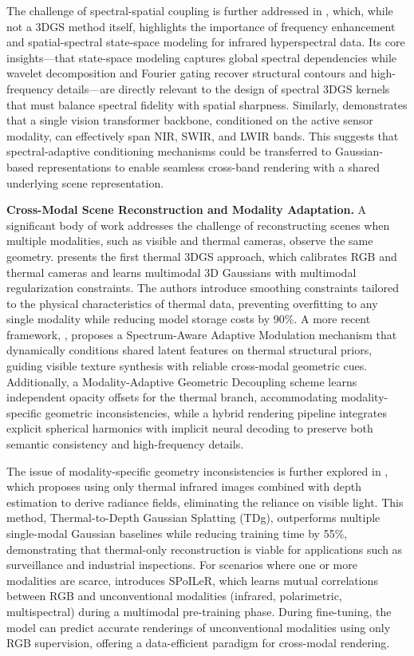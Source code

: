 \documentclass[11pt]{article}
\begin{document}
The challenge of spectral-spatial coupling is further addressed in \cite{ref620}, which, while not a 3DGS method itself, highlights the importance of frequency enhancement and spatial-spectral state-space modeling for infrared hyperspectral data. Its core insights---that state-space modeling captures global spectral dependencies while wavelet decomposition and Fourier gating recover structural contours and high-frequency details---are directly relevant to the design of spectral 3DGS kernels that must balance spectral fidelity with spatial sharpness. Similarly, \cite{ref621} demonstrates that a single vision transformer backbone, conditioned on the active sensor modality, can effectively span NIR, SWIR, and LWIR bands. This suggests that spectral-adaptive conditioning mechanisms could be transferred to Gaussian-based representations to enable seamless cross-band rendering with a shared underlying scene representation.

\textbf{Cross-Modal Scene Reconstruction and Modality Adaptation.} A significant body of work addresses the challenge of reconstructing scenes when multiple modalities, such as visible and thermal cameras, observe the same geometry. \cite{ref622} presents the first thermal 3DGS approach, which calibrates RGB and thermal cameras and learns multimodal 3D Gaussians with multimodal regularization constraints. The authors introduce smoothing constraints tailored to the physical characteristics of thermal data, preventing overfitting to any single modality while reducing model storage costs by 90\%. A more recent framework, \cite{ref623}, proposes a Spectrum-Aware Adaptive Modulation mechanism that dynamically conditions shared latent features on thermal structural priors, guiding visible texture synthesis with reliable cross-modal geometric cues. Additionally, a Modality-Adaptive Geometric Decoupling scheme learns independent opacity offsets for the thermal branch, accommodating modality-specific geometric inconsistencies, while a hybrid rendering pipeline integrates explicit spherical harmonics with implicit neural decoding to preserve both semantic consistency and high-frequency details.

The issue of modality-specific geometry inconsistencies is further explored in \cite{ref624}, which proposes using only thermal infrared images combined with depth estimation to derive radiance fields, eliminating the reliance on visible light. This method, Thermal-to-Depth Gaussian Splatting (TDg), outperforms multiple single-modal Gaussian baselines while reducing training time by 55\%, demonstrating that thermal-only reconstruction is viable for applications such as surveillance and industrial inspections. For scenarios where one or more modalities are scarce, \cite{ref625} introduces SPoILeR, which learns mutual correlations between RGB and unconventional modalities (infrared, polarimetric, multispectral) during a multimodal pre-training phase. During fine-tuning, the model can predict accurate renderings of unconventional modalities using only RGB supervision, offering a data-efficient paradigm for cross-modal rendering.
\end{document}
